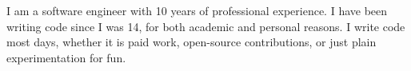 \documentclass[10pt,a4paper,ragged2e,withhyper]{altacv}
\begin{document}


\makecvheader



I am a software engineer with 10 years of professional experience. I have been writing code since I was 14, for both academic and personal reasons. I write code most days, whether it is paid work, open-source contributions, or just plain experimentation for fun.
\end{document}
